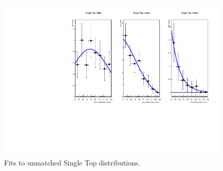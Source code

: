 \begin{figure}[h!]
\centering
\includegraphics[scale=0.87]{EXO-12-024/figs/WtagSF/SingleTop_fits.pdf}
\caption{Fits to unmatched Single Top distributions.}\label{fig:bkgIII}
\end{figure}
